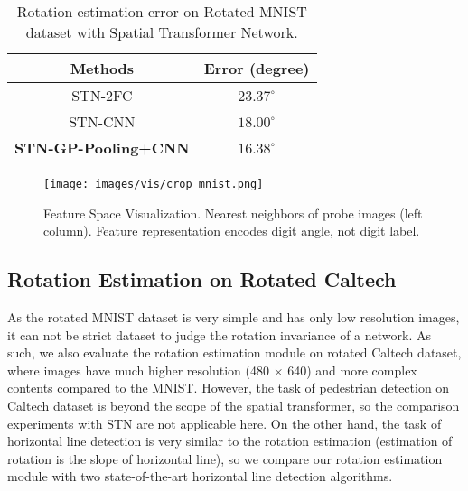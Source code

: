 \documentclass[10pt,twocolumn,letterpaper]{article}
\begin{document}
\begin{table}[tb]
\centering
\footnotesize
\begin{tabular}{ |c|c| }
        \hline
        Methods & Error (degree) \\
        \hline
        \hline
        STN-2FC \cite{Jaderberg2015}       &   $23.37^{\circ}$        \\
        STN-CNN \cite{Jaderberg2015}       &   $18.00^{\circ}$        \\
        \textbf{STN-GP-Pooling+CNN}                 &   $\mathbf{16.38^{\circ}}$       \\
        \hline
\end{tabular}
\vspace{0.2cm}
\caption{Rotation estimation error on Rotated MNIST dataset with Spatial Transformer Network.}
\label{tab:exp1_mnist} 
\end{table}

\begin{figure}[tb]
    \centering
    \texttt{[image: images/vis/crop\_mnist.png]}
    \caption{Feature Space Visualization. Nearest neighbors of probe images (left column). Feature representation encodes digit angle, not digit label.}
    \label{fig:nn_vis_mnist}
    \vspace{-0.3cm}
\end{figure}


\subsection{Rotation Estimation on Rotated Caltech}
As the rotated MNIST dataset is very simple and has only low resolution images, it can not be strict dataset to judge the rotation invariance of a network. As such, we also evaluate the rotation estimation module on rotated Caltech dataset, where images have much higher resolution (480 $\times$ 640) and more complex contents compared to the MNIST. However, the task of pedestrian detection on Caltech dataset is beyond the scope of the spatial transformer, so the comparison experiments with STN are not applicable here. On the other hand, the task of horizontal line detection is very similar to the rotation estimation (estimation of rotation is the slope of horizontal line), so we compare our rotation estimation module with two state-of-the-art horizontal line detection algorithms. 
\end{document}
